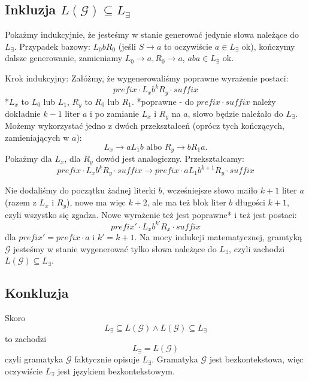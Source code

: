 \documentclass{article}
\begin{document}
\newpage

\subsection*{Inkluzja $ L(\mathcal{G}) \subseteq L_{\exists}$}
Pokażmy indukcyjnie, że jesteśmy w stanie generować jedynie słowa należące do $L_{\exists}$. \newline \newline
Przypadek bazowy: $L_0bR_0$ (jeśli $S \to a$ to oczywiście $a \in L_{\exists}$ ok), \newline 
kończymy dalsze generowanie, zamieniamy $L_0 \to a, R_0 \to a$, $aba \in L_{\exists}$ ok. \newline 

Krok indukcyjny: \newline
Załóżmy, że wygenerowaliśmy poprawne wyrażenie postaci: 
$$prefix \cdot L_xb^kR_y \cdot suffix $$
*$L_x$ to $L_0$ lub $L_1$, $R_y$ to $R_0$ lub $R_1$. \newline
*poprawne - do $prefix \cdot suffix$ należy dokładnie $k-1$ liter $a$ i po zamianie $L_x$ i $R_y$ na $a$, słowo będzie należało do $L_{\exists}$. \newline\newline
Możemy wykorzystać jedno z dwóch przekształceń (oprócz tych kończących, zamieniających w $a$):
$$L_x \to aL_1b \mbox{ albo } R_y \to bR_1a.$$
Pokażmy dla $L_x$, dla $R_y$ dowód jest analogiczny.
Przekształcamy: 
$$prefix \cdot L_xb^kR_y \cdot suffix \to prefix \cdot aL_1b^{k+1}R_y \cdot suffix $$

Nie dodaliśmy do początku żadnej literki $b$, wcześniejsze słowo maiło $k+1$ liter $a$ (razem z $L_x$ i $R_y$), nowe ma więc $k+2$, ale ma też blok liter $b$ długości $k+1$, czyli wszystko się zgadza. Nowe wyrażenie też jest poprawne* i też jest postaci: $$prefix'\cdot L_xb^{k'}R_x \cdot suffix$$
dla $prefix' = prefix \cdot a$ i $k' = k+1$. \newline
Na mocy indukcji matematycznej, gramtyką $\mathcal{G}$ jesteśmy w stanie wygenerować tylko słowa należące do $L_{\exists}$, czyli zachodzi $ L(\mathcal{G}) \subseteq L_{\exists}$.

\subsection*{Konkluzja}
Skoro
$$L_{\exists} \subseteq L(\mathcal{G}) \land L(\mathcal{G}) \subseteq L_{\exists}$$
to zachodzi
$$ L_{\exists} = L(\mathcal{G}) $$
czyli gramatyka $\mathcal{G}$ faktycznie opisuje $L_{\exists}$. Gramatyka $\mathcal{G}$ jest bezkontekstowa, więc oczywiście $L_{\exists}$ jest językiem bezkontekstowym.
\end{document}
